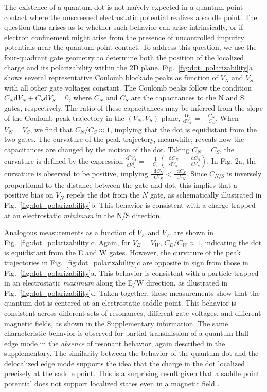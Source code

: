 \documentclass[reprint,prl,aps,superscriptaddress]{revtex4-1}
\newcommand\dif{\mathop{}\!\mathrm{d}}
\begin{document}
The existence of a quantum dot is not na\"ively expected in a quantum point contact where the unscreened electrostatic potential realizes a saddle point.  The question thus arises as to whether such behavior can arise intrinsically, or if electron confinement might arise from the presence of uncontrolled impurity potentials near the quantum point contact.  
To address this question, we  use the four-quadrant gate geometry \cite{cohen_nanoscale_2023} to determine both the position of the localized charge and its polarizability within the 2D plane.  
Fig.~\ref{fig:dot_polarizability}a shows several representative Coulomb blockade peaks as function of $V_N$ and $V_S$ with all other gate voltages constant. The Coulomb peaks follow the condition $C_N  \mathrm{d} V_N + C_S \mathrm{d} V_S  = 0$, where $C_N$ and $C_S$ are the capacitances to the N and S gates, respectively. 
The ratio of these capacitances may be inferred from the slope of the Coulomb peak trajectory in the $(V_N,V_S)$ plane,  $\frac{ \mathrm{d} V_S}{ \mathrm{d} V_N} = - \frac{C_N}{C_S}$. 
When $V_N = V_S$, we find that $C_N/C_S\approx1$, implying that the dot is equidistant from the two gates. 
The curvature of the peak trajectory, meanwhile, reveals how the capacitances are changed by the motion of the dot.  
Taking $C_N = C_S$, the curvature is defined by the expression  $\frac{ \mathrm{d}^2 V_S}{ \mathrm{d} V^2_N} = - \frac{1}{C_S} ( \frac{\dif C_N}{\dif V_N} - \frac{\dif C_S}{\dif V_N})$. In Fig. 2a, the curvature is observed to be positive, implying $\frac{\dif C_N}{\dif V_N} < \frac{\dif C_S}{\dif V_N}$. Since $C_{N/S}$ is inversely proportional to the distance between the gate and dot, this implies that a positive bias on $V_{N}$ repels the dot from the $N$ gate, as schematically illustrated in Fig.~\ref{fig:dot_polarizability}b. This behavior is consistent with a charge trapped at an electrostatic \textit{minimum} in the N/S direction. 

Analogous measurements as a function of $V_E$ and $V_W$ are shown in Fig.~\ref{fig:dot_polarizability}c.  Again, for $V_E = V_W$, $C_E/C_W\approx 1$, indicating the dot is equidistant from the E and W gates.  However, the curvature of the peak trajectories in Fig.~\ref{fig:dot_polarizability}c are opposite in sign from those in Fig.~\ref{fig:dot_polarizability}a. This behavior is consistent with a particle trapped in an electrostatic \textit{maximum} along the E/W direction, as illustrated in Fig.~\ref{fig:dot_polarizability}d. 
Taken together, these measurements show that the quantum dot is centered at an electrostatic saddle point.  This behavior is consistent across different sets of resonances, different gate voltages, and different magnetic fields, as shown in the Supplementary information. 
The same characteristic behavior is observed for partial transmission of a quantum Hall edge mode in the \textit{absence} of resonant behavior, again described in the supplementary.  The similarity between the behavior of the quantum dot and the delocalized edge mode supports the idea that the charge in the dot localized precisely at the saddle point.  This is a surprising result given that a saddle point potential does not support localized states even in a magnetic field \cite{hegde_quasinormal_2019, floser_transmission_2010}. 
\end{document}
